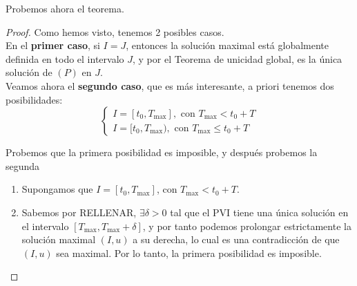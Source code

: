 \begin{observación}
\begin{center}
    \end{center}

\end{observación}

Probemos ahora el teorema.

\begin{proof}
    Como hemos visto, tenemos 2 posibles casos.\\

    En el \textbf{primer caso}, si $I = J$, entonces la solución maximal está globalmente definida en todo el intervalo $J$, y por el Teorema de unicidad global, es la única solución de $(P)$ en $J$.\\

    Veamos ahora el \textbf{segundo caso}, que es más interesante, a priori tenemos dos posibilidades:
    \[
        \begin{cases}
            I = [t_0, T_{\text{max}}], \text{ con } T_{\text{max}} < t_0 + T \\
            \boxed{I = [t_0, T_{\text{max}}), \text{ con } T_{\text{max}} \leq t_0 + T}
        \end{cases}
    \]

    Probemos que la primera posibilidad es imposible, y después probemos la segunda
    \begin{enumerate}
        \item Supongamos que $I = [t_0, T_{\text{max}}]$, con $T_{\text{max}} < t_0 + T$.\\
        \item 
        Sabemos por RELLENAR, $\exists \delta > 0$ tal que el PVI tiene una única solución en el intervalo $[T_{\text{max}}, T_{\text{max}} + \delta]$, y por tanto podemos prolongar estrictamente la solución maximal $(I, u)$ a su derecha, lo cual es una contradicción de que $(I, u)$ sea maximal. Por lo tanto, la primera posibilidad es imposible.\\


\end{enumerate}
\end{proof}
